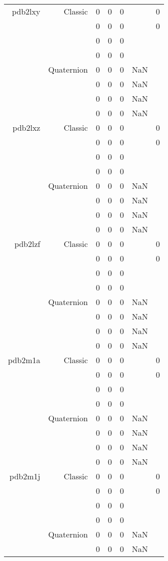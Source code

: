 \begin{xltabular}{\textwidth}{r|rcccSc}
pdb2lxy & Classic & 0 & 0 & 0 & & 0 \\
& & 0 & 0 & 0 & & 0 \\
& & 0 & 0 & 0 & & \\
& & 0 & 0 & 0 & & \\
& Quaternion & 0 & 0 & 0 & NaN & \\
& & 0 & 0 & 0 & NaN & \\
& & 0 & 0 & 0 & NaN & \\
& & 0 & 0 & 0 & NaN & \\ \addlinespace
pdb2lxz & Classic & 0 & 0 & 0 & & 0 \\
& & 0 & 0 & 0 & & 0 \\
& & 0 & 0 & 0 & & \\
& & 0 & 0 & 0 & & \\
& Quaternion & 0 & 0 & 0 & NaN & \\
& & 0 & 0 & 0 & NaN & \\
& & 0 & 0 & 0 & NaN & \\
& & 0 & 0 & 0 & NaN & \\ \addlinespace
pdb2lzf & Classic & 0 & 0 & 0 & & 0 \\
& & 0 & 0 & 0 & & 0 \\
& & 0 & 0 & 0 & & \\
& & 0 & 0 & 0 & & \\
& Quaternion & 0 & 0 & 0 & NaN & \\
& & 0 & 0 & 0 & NaN & \\
& & 0 & 0 & 0 & NaN & \\
& & 0 & 0 & 0 & NaN & \\ \addlinespace
pdb2m1a & Classic & 0 & 0 & 0 & & 0 \\
& & 0 & 0 & 0 & & 0 \\
& & 0 & 0 & 0 & & \\
& & 0 & 0 & 0 & & \\
& Quaternion & 0 & 0 & 0 & NaN & \\
& & 0 & 0 & 0 & NaN & \\
& & 0 & 0 & 0 & NaN & \\
& & 0 & 0 & 0 & NaN & \\ \addlinespace
pdb2m1j & Classic & 0 & 0 & 0 & & 0 \\
& & 0 & 0 & 0 & & 0 \\
& & 0 & 0 & 0 & & \\
& & 0 & 0 & 0 & & \\
& Quaternion & 0 & 0 & 0 & NaN & \\
& & 0 & 0 & 0 & NaN & \\

\end{xltabular}
